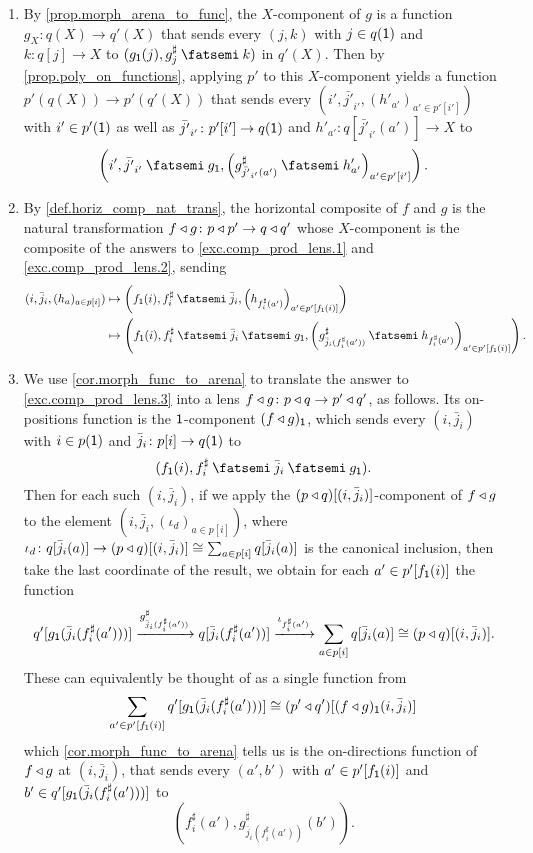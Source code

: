 \documentclass[Book-Poly]{subfiles}
\begin{document}
\begin{exercise}
\begin{solution}
\begin{enumerate}
    \item By \cref{prop.morph_arena_to_func}, the $X$-component of $g$ is a function $g_X\colon q(X)\to q'(X)$ that sends every $(j,k)$ with $j\in q(\textsf{1})$ and $k\colon q[j]\to X$ to $(g_\1(j),g^\sharp_j\then k)$ in $q'(X)$.
    Then by \cref{prop.poly_on_functions}, applying $p'$ to this $X$-component yields a function $p'(q(X))\to p'(q'(X))$ that sends every $(i',\bar{j'}_{i'},(h'_{a'})_{a'\in p'[i']})$ with $i'\in p'(\textsf{1})$ as well as $\bar{j'}_{i'}\colon p'[i']\to q(\textsf{1})$ and $h'_{a'}\colon q[\bar{j'}_{i'}(a')]\to X$ to \[\left(i',\bar{j'}_{i'}\then g_\1,\left(g^\sharp_{\bar{j'}_{i'}(a')}\then h'_{a'}\right)_{a'\in p'[i']}\right).\]
    
    \item By \cref{def.horiz_comp_nat_trans}, the horizontal composite of $f$ and $g$ is the natural transformation $f\mathbin{\triangleleft} g\colon p\mathbin{\triangleleft} p'\to q\mathbin{\triangleleft} q'$ whose $X$-component is the composite of the answers to \cref{exc.comp_prod_lens.1} and \cref{exc.comp_prod_lens.2}, sending
    \begin{align*}
        (i,\bar{j}_i,(h_a)_{a\in p[i]})&\mapsto\left(f_\1(i),f^\sharp_i\then\bar{j}_i,\left(h_{f^\sharp_i(a')}\right)_{a'\in p'[f_\1(i)]}\right)\\
        &\mapsto\left(f_\1(i),f^\sharp_i\then\bar{j}_i\then g_\1, \left(g^\sharp_{\bar{j}_{i}(f^\sharp_i(a'))}\then h_{f^\sharp_i(a')}\right)_{a'\in p'[f_\1(i)]}\right).
    \end{align*}
    
    \item We use \cref{cor.morph_func_to_arena} to translate the answer to \cref{exc.comp_prod_lens.3} into a lens $f\mathbin{\triangleleft} g\colon p\mathbin{\triangleleft} q\to p'\mathbin{\triangleleft} q'$, as follows.
    Its on-positions function is the $\textsf{1}$-component $(f\mathbin{\triangleleft} g)_{\textsf{1}}$, which sends every $(i,\bar{j}_i)$ with $i\in p(\textsf{1})$ and $\bar{j}_i\colon p[i]\to q(\textsf{1})$ to
    \[
        (f_\1(i),f^\sharp_i\then\bar{j}_i\then g_\1).
    \]
    Then for each such $(i,\bar{j}_i)$, if we apply the $(p\mathbin{\triangleleft} q)[(i,\bar{j}_i)]$-component of $f\mathbin{\triangleleft} g$ to the element $(i,\bar{j}_i,(\iota_d)_{a\in p[i]})$, where $\iota_d\colon q[\bar{j}_i(a)]\to(p\mathbin{\triangleleft} q)[(i,\bar{j}_i)]\cong\sum_{a\in p[i]}q[\bar{j}_i(a)]$ is the canonical inclusion, then take the last coordinate of the result, we obtain for each $a'\in p'[f_{\textsf{1}}(i)]$ the function
    \[
        q'[g_{\textsf{1}}(\bar{j}_i(f^\sharp_i(a')))] \xrightarrow{g^\sharp_{\bar{j}_{i}(f^\sharp_i(a'))}} q[\bar{j}_i(f^\sharp_i(a'))] \xrightarrow{\iota_{f^\sharp_i(a')}} \sum_{a\in p[i]}q[\bar{j}_i(a)] \cong (p\mathbin{\triangleleft} q)[(i,\bar{j}_i)].
    \]
    These can equivalently be thought of as a single function from
    \[
        \sum_{a'\in p'[f_{\textsf{1}}(i)]} q'[g_{\textsf{1}}(\bar{j}_i(f^\sharp_i(a')))] \cong (p'\mathbin{\triangleleft} q')[(f\mathbin{\triangleleft} g)_{\textsf{1}}(i,\bar{j}_i)]
    \]
    which \cref{cor.morph_func_to_arena} tells us is the on-directions function of $f\mathbin{\triangleleft} g$ at $(i,\bar{j}_i)$, that sends every $(a',b')$ with $a'\in p'[f_{\textsf{1}}(i)]$ and $b'\in q'[g_{\textsf{1}}(\bar{j}_i(f^\sharp_i(a')))]$ to
    \[
        \left(f^\sharp_i(a'), g^\sharp_{\bar{j}_i(f^\sharp_i(a'))}(b')\right).
    \]
\end{enumerate}
\end{solution}
\end{exercise}
\end{document}
